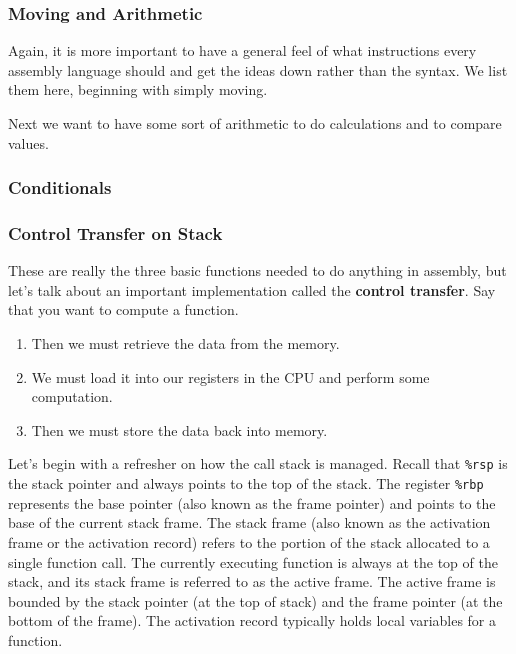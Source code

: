     \subsubsection{Moving and Arithmetic} 

      Again, it is more important to have a general feel of what instructions every assembly language should  and get the ideas down rather than the syntax. We list them here, beginning with simply moving. 


      \begin{definition}[Moving]
        
      \end{definition}

      Next we want to have some sort of arithmetic to do calculations and to compare values. 

      \begin{definition}
        
      \end{definition}

    \subsubsection{Conditionals}

      \begin{definition}[Conditionals]
        
      \end{definition}

    \subsubsection{Control Transfer on Stack}

      These are really the three basic functions needed to do anything in assembly, but let's talk about an important implementation called the \textbf{control transfer}. Say that you want to compute a function. 
      \begin{enumerate}
        \item Then we must retrieve the data from the memory. 
        \item We must load it into our registers in the CPU and perform some computation. 
        \item Then we must store the data back into memory. 
      \end{enumerate}

      Let’s begin with a refresher on how the call stack is managed. Recall that \texttt{\%rsp} is the stack pointer and always points to the top of the stack. The register \texttt{\%rbp} represents the base pointer (also known as the frame pointer) and points to the base of the current stack frame. The stack frame (also known as the activation frame or the activation record) refers to the portion of the stack allocated to a single function call. The currently executing function is always at the top of the stack, and its stack frame is referred to as the active frame. The active frame is bounded by the stack pointer (at the top of stack) and the frame pointer (at the bottom of the frame). The activation record typically holds local variables for a function.

